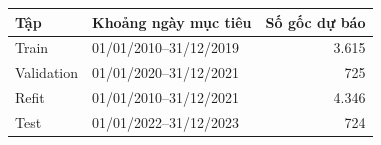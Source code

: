 \begin{tabular}{llr}
\toprule
Tập & Khoảng ngày mục tiêu & Số gốc dự báo \\
\midrule
Train & 01/01/2010–31/12/2019 & 3.615 \\
Validation & 01/01/2020–31/12/2021 & 725 \\
Refit & 01/01/2010–31/12/2021 & 4.346 \\
Test & 01/01/2022–31/12/2023 & 724 \\
\bottomrule
\end{tabular}
